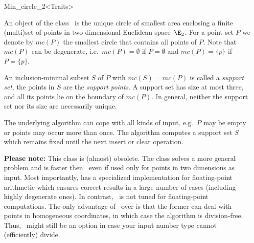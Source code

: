 
\begin{ccRefClass}{Min_circle_2<Traits>}


\ccSaveThreeColumns
\cgalMinCircleLayout

\ccDefinition

An object of the class \ccRefName\ is the unique circle of smallest area
enclosing a finite (multi)set of points in two-dimensional Euclidean
space~$\E_2$.  For a point set $P$ we denote by $mc(P)$ the smallest circle
that contains all points of $P$. Note that $mc(P)$ can be
degenerate,
i.e.~$mc(P)=\emptyset$ if
$P=\emptyset$ and $mc(P)=\{p\}$ if
$P=\{p\}$.

An inclusion-minimal subset $S$ of $P$ with $mc(S)=mc(P)$ is called a
\emph{support set},
the points in $S$ are the \emph{support points}.  A support set has size at
most three, and all its points lie on the boundary of $mc(P)$. In general,
neither the support set nor its size are necessarily unique.

The underlying algorithm can cope with all kinds of input, e.g.~$P$ may be
empty or points may occur more than once. The algorithm computes a support
set $S$ which remains fixed until the next insert or clear operation.

{\bf Please note:} This class is (almost) obsolete. The class
 solves a more general problem
and is faster then \ccRefName\, even if used only for points in two
dimensions as input. Most importantly, 
 has
a specialized implementation for floating-point arithmetic which
ensures correct results in a large number of cases (including
highly degenerate ones). In contrast, \ccRefName\ is not tuned for
floating-point computations. The only advantage of 
\ccRefName\ over  is that the
former can deal with points in homogeneous coordinates, in which 
case the algorithm is division-free. Thus, \ccRefName\ might still
be an option in case your input number type cannot (efficiently) 
divide.


\end{ccRefClass}
